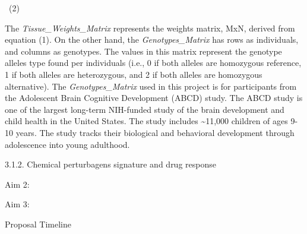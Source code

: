 \documentclass[
]{article}
\begin{document}
{~}(2)

The \emph{Tissue\_Weights\_Matrix} represents the weights matrix, MxN,
derived from equation (1). On the other hand, the
\emph{Genotypes\_Matrix} has rows as individuals, and columns as
genotypes. The values in this matrix represent the genotype alleles type
found per individuals (i.e., 0 if both alleles are homozygous reference,
1 if both alleles are heterozygous, and 2 if both alleles are homozygous
alternative). The \emph{Genotypes\_Matrix} used in this project is for
participants from the Adolescent Brain Cognitive Development (ABCD)
study. The ABCD study is one of the largest long-term NIH-funded study
of the brain development and child health in the United States. The
study includes \textasciitilde11,000 children of ages 9-10 years. The
study tracks their biological and behavioral development through
adolescence into young adulthood.{~}

3.1.2. Chemical perturbagens signature and drug response

\hfill\break

Aim 2:

\hfill\break

Aim 3:

\hfill\break

Proposal Timeline

{~}
\end{document}
